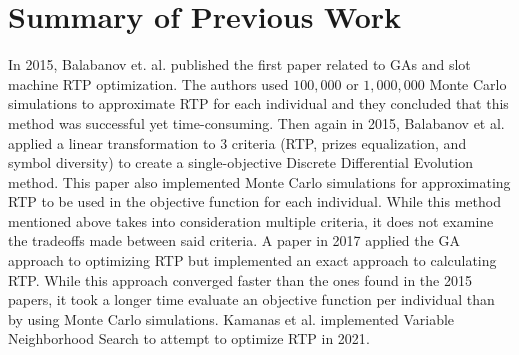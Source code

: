 \documentclass[11pt]{article} %
\begin{document}
\section{Summary of Previous Work}
\par
In 2015, Balabanov et. al. published the first paper related to GAs and slot machine RTP optimization\cite{balabanov2015slot}. 
The authors used $100,000$ or $1,000,000$ Monte Carlo simulations to approximate RTP for each individual and they concluded that this method was successful yet time-consuming.
Then again in 2015, Balabanov et al. applied a linear transformation to 3 criteria (RTP, prizes equalization, and symbol diversity) to create a single-objective Discrete Differential Evolution method\cite{balabanovDDE}.
This paper also implemented Monte Carlo simulations for approximating RTP to be used in the objective function for each individual.
While this method mentioned above takes into consideration multiple criteria, it does not examine the tradeoffs made between said criteria.
A paper in 2017 applied the GA approach to optimizing RTP but implemented an exact approach to calculating RTP\cite{keremedchiev2017slot}.
While this approach converged faster than the ones found in the 2015 papers, it took a longer time evaluate an objective function per individual than by using Monte Carlo simulations.
Kamanas et al. implemented Variable Neighborhood Search to attempt to optimize RTP in 2021\cite{kamanas2021slot}.
\printbibliography[title={References}]
\end{document}
